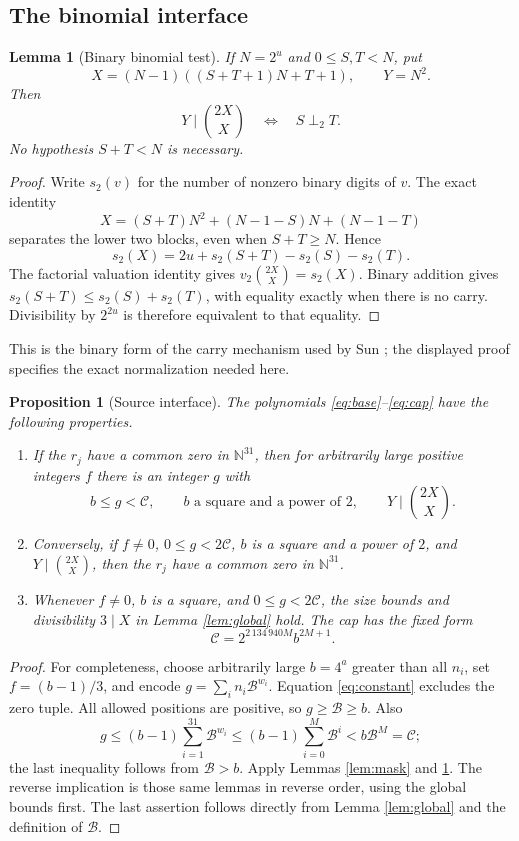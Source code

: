 \documentclass[11pt,a4paper]{article}
\newtheorem{lemma}[theorem]{Lemma}
\newtheorem{proposition}[theorem]{Proposition}
\theoremstyle{remark}
\newcommand{\N}{\mathbb N}
\newcommand{\B}{\mathcal B}
\renewcommand{\Cap}{\mathscr C}
\newcommand{\nocarry}{\mathrel{\perp_2}}
\begin{document}
\subsection{The binomial interface}
\begin{lemma}[Binary binomial test]\label{lem:binomial}
If \(N=2^u\) and \(0\le S,T<N\), put
\[
X=(N-1)((S+T+1)N+T+1),\qquad Y=N^2.
\]
Then
\[
Y\mid\binom{2X}{X}\quad\Longleftrightarrow\quad S\nocarry T.
\]
No hypothesis \(S+T<N\) is necessary.
\end{lemma}
\begin{proof}
Write \(s_2(v)\) for the number of nonzero binary digits of \(v\).
The exact identity
\[
X=(S+T)N^2+(N-1-S)N+(N-1-T)
\]
separates the lower two blocks, even when \(S+T\ge N\).
Hence
\[
s_2(X)=2u+s_2(S+T)-s_2(S)-s_2(T).
\]
The factorial valuation identity gives
\(v_2\binom{2X}{X}=s_2(X)\).
Binary addition gives \(s_2(S+T)\le s_2(S)+s_2(T)\), with
equality exactly when there is no carry. Divisibility by \(2^{2u}\)
is therefore equivalent to that equality.
\end{proof}
This is the binary form of the carry mechanism used by Sun
\cite[Lemmas 2.2 and 2.4]{sun2021}; the displayed proof specifies
the exact normalization needed here.

\begin{proposition}[Source interface]\label{prop:interface}
The polynomials \eqref{eq:base}--\eqref{eq:cap} have the following
properties.
\begin{enumerate}
\item If the \(r_j\) have a common zero in \(\N^{31}\), then for
arbitrarily large positive integers \(f\) there is an integer \(g\)
with
\[
b\le g<\Cap,\qquad b\text{ a square and a power of }2,\qquad
Y\mid\binom{2X}{X}.
\]
\item Conversely, if \(f\ne0\), \(0\le g<2\Cap\), \(b\) is a square
and a power of \(2\), and \(Y\mid\binom{2X}{X}\), then the \(r_j\)
have a common zero in \(\N^{31}\).
\item Whenever \(f\ne0\), \(b\) is a square, and
\(0\le g<2\Cap\), the size bounds and divisibility \(3\mid X\)
in Lemma \ref{lem:global} hold. The cap has the fixed form
\[
\Cap=2^{2\,134\,940M}b^{2M+1}.
\]
\end{enumerate}
\end{proposition}
\begin{proof}
For completeness, choose arbitrarily large \(b=4^a\) greater than
all \(n_i\), set \(f=(b-1)/3\), and encode
\(g=\sum_i n_i\B^{w_i}\).
Equation \eqref{eq:constant} excludes the zero tuple. All allowed
positions are positive, so \(g\ge\B\ge b\). Also
\[
g\le(b-1)\sum_{i=1}^{31}\B^{w_i}
\le(b-1)\sum_{i=0}^{M}\B^i<b\B^M=\Cap;
\]
the last inequality follows from \(\B>b\).
Apply Lemmas \ref{lem:mask} and \ref{lem:binomial}.
The reverse implication is those same lemmas in reverse order,
using the global bounds first. The last assertion follows directly
from Lemma \ref{lem:global} and the definition of \(\B\).
\end{proof}
\end{document}
